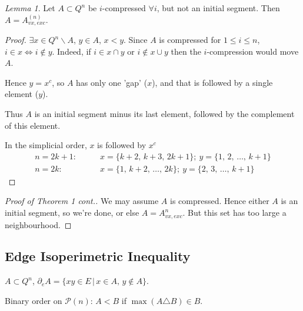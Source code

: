 \documentclass[a4paper]{article}
\theoremstyle{definition}
\theoremstyle{remark}
\theoremstyle{default}
\newtheorem{lemma}[theorem]{Lemma}
\begin{document}
\begin{lemma}
	Let $A \subset Q^n$ be $i$-compressed $\forall i$,
	but not an initial segment.
	Then $A = A^{(n)}_{vx, exc}$.
\end{lemma}
\begin{proof}
	$\exists x \in Q^n \backslash A$, $y \in A$, $x < y$.
	Since $A$ is compressed for $1 \leq i \leq n$,
	$i \in x \iff i \not\in y$.
	Indeed, if $i \in x \cap y$ or $i \not\in x \cup y$ then the $i$-compression would move $A$.
	
	Hence $y = x^c$,
	so $A$ has only one 'gap' ($x$),
	and that is followed by a single element ($y$).
	
	Thus $A$ is an initial segment minus its last element,
	followed by the complement of this element.
	
	In the simplicial order, $x$ is followed by $x^c$
	\begin{align*}
	n=2k+1:\qquad & x = \{k+2,\, k+3,\, 2k+1\};\ y=\{1,\, 2,\, \dots,\, k+1\} \\
	n=2k:\qquad & x = \{1,\, k+2,\, \dots,\, 2k\};\ y=\{2,\, 3,\, \dots,\, k+1\}
	\end{align*}
\end{proof}

\begin{proof}[Proof of Theorem 1 cont.]
	We may assume $A$ is compressed.
	Hence either $A$ is an initial segment,
	so we're done,
	or else $A = A^n_{vx, exc}$. But this set has too large a neighbourhood.
\end{proof}

\subsection{Edge Isoperimetric Inequality}

$A \subset Q^n$, $\partial_e A = \{xy \in E \,|\, x \in A,\, y \not\in A\}$.

Binary order on $\mathcal{P}(n)$: $A<B$ if $\max(A\triangle B) \in B$.
\end{document}
